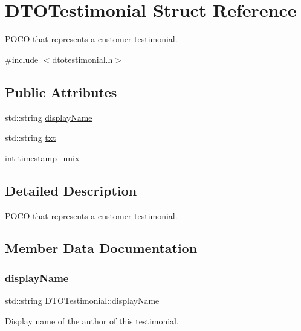 \hypertarget{struct_d_t_o_testimonial}{}\section{D\+T\+O\+Testimonial Struct Reference}
\label{struct_d_t_o_testimonial}


P\+O\+CO that represents a customer testimonial.  




{\ttfamily \#include $<$dtotestimonial.\+h$>$}

\subsection*{Public Attributes}
\begin{DoxyCompactItemize}
\item 
std\+::string \mbox{\hyperlink{struct_d_t_o_testimonial_a921b43f474c61d95bf567b35923e9054}{display\+Name}}
\item 
std\+::string \mbox{\hyperlink{struct_d_t_o_testimonial_a2fe975367ddcb0e51ff4834ecf40a503}{txt}}
\item 
int \mbox{\hyperlink{struct_d_t_o_testimonial_a66672c5d252a46d247997e9e67c600c3}{timestamp\+\_\+unix}}
\end{DoxyCompactItemize}


\subsection{Detailed Description}
P\+O\+CO that represents a customer testimonial. 



\subsection{Member Data Documentation}
\mbox{\label{struct_d_t_o_testimonial_a921b43f474c61d95bf567b35923e9054}} 
\subsubsection{\texorpdfstring{displayName}{displayName}}
{\footnotesize\ttfamily std\+::string D\+T\+O\+Testimonial\+::display\+Name}

Display name of the author of this testimonial. \mbox{\label{struct_d_t_o_testimonial_a66672c5d252a46d247997e9e67c600c3}} 
